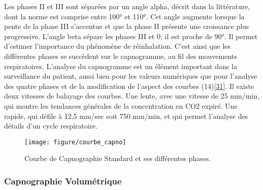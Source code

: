 \documentclass[12pt,]{article}
\begin{document}
Les phases II et III sont séparées par un angle alpha, décrit dans la
littérature, dont la norme est comprise entre 100° et 110°. Cet angle
augmente lorsque la pente de la phase III s'accentue et que la phase II
présente une croissance plus progressive. L'angle beta sépare les phases
III et 0, il est proche de 90°. Il permet d'estimer l'importance du
phénomène de réinhalation. C'est ainsi que les différentes phases se
succèdent sur le capnogramme, au fil des mouvements respiratoires.
L'analyse du capnogramme est un élément important dans la surveillance
du patient, aussi bien pour les valeurs numériques que pour l'analyse
des quatre phases et de la modification de l'aspect des courbes
(14){[}\protect\hyperlink{ref-howe2011use}{31}{]}. Il existe deux
vitesses de balayage des courbes. Une lente, avec une vitesse de 25
mm/min, qui montre les tendances générales de la concentration en CO2
expiré. Une rapide, qui défile à 12.5 mm/sec soit 750 mm/min, et qui
permet l'analyse des détails d'un cycle respiratoire.

\begin{figure}[h!]

{\centering \texttt{[image: figure/courbe\_capno]} 

}

\caption{Courbe de Capnographie Standard et ses différentes phases.}\label{fig:unnamed-chunk-5}
\end{figure}

\hypertarget{capnographie-volumetrique}{%
\subsubsection{Capnographie
Volumétrique}\label{capnographie-volumetrique}}
\end{document}
